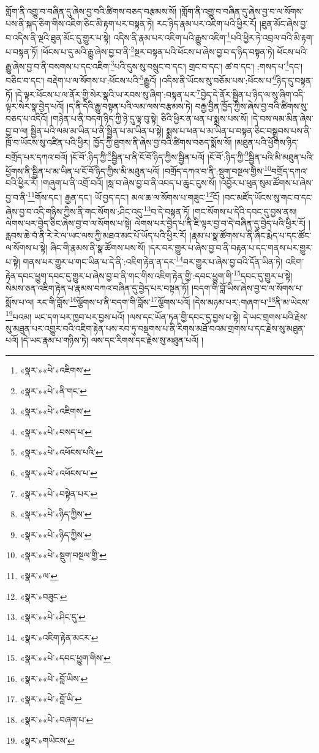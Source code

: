 གློག་ནི་འགྱུ་བ་བཞིན་དུ་ཞེས་བྱ་བའི་ཚིགས་བཅད་བརྩམས་སོ། །གློག་ནི་འགྱུ་བ་བཞིན་དུ་ཞེས་བྱ་བ་ལ་སོགས་པས་ནི་སྐད་ཅིག་གིས་འཇིག་ཅིང་མི་རྟག་པར་བསྟན་ཏེ། རང་ཉིད་རྣམ་པར་འཇིག་པའི་ཕྱིར་རོ། །ཐུན་མོང་ཞེས་བྱ་བ་འདིས་ནི་ལྔའི་ཐུན་མོང་དུ་གྱུར་པ་སྟེ། འདིས་ནི་རྣམ་པར་འཇིག་པའི་རྒྱུས་འཇིག་\footnote{«སྣར་»«པེ་»འཇིགས་}པའི་ཕྱིར་ཏེ་འབྲལ་བའི་མི་རྟག་པ་བསྟན་ཏོ། །ཕོངས་པ་དུ་མའི་རྒྱུ་ཞེས་བྱ་བ་ནི་\footnote{«སྣར་»«པེ་»ནི་གང་}སྔར་བསྟན་པའི་ཕོངས་པ་ཞེས་བྱ་བ་ད་ཉིད་བསྟན་ཏེ། ཕོངས་པའི་རྒྱུ་ཞེས་བྱ་བ་ནི་བསགས་པ་དང་འཇིག་\footnote{«སྣར་»«པེ་»འཇིགས་}པའི་དུས་སུ་བསྲུང་བ་དང་། གྲང་བ་དང་། ཚ་བ་དང་། :གསད་པ་\footnote{«སྣར་»«པེ་»བསད་པ་}དང་། བཅིང་བ་དང་། བརྡེག་པ་ལ་སོགས་པ་:ཕོངས་པའི་\footnote{«སྣར་»«པེ་»འཕོངས་པའི་}རྒྱུའོ། །འདིས་ནི་ཡོངས་སུ་བཅོམ་པས་:ཕོངས་པ་\footnote{«སྣར་»«པེ་»འཕོངས་པ་}ཉིད་དུ་བསྟན་ཏོ། །དེ་ལྟར་ཕོངས་པ་ལ་ནོར་གྱི་སེར་སྣའི་ཡ་རབས་སུ་ཞིག་:བསྟན་པར་\footnote{«སྣར་»«པེ་»བསྟེན་པར་}བྱེད་དེ་ནོར་སྦྱིན་པ་ཉིད་ལ་སུ་ཞིག་འདི་ལྟར་སེར་སྣ་བྱེད་པའོ། །ད་ནི་དེའི་རྒྱུ་བསྟན་པའི་ལམ་ལས་བརྩམས་ཏེ། བརྒྱ་བྱིན་ཁྱོད་ཀྱིས་ཞེས་བྱ་བའི་ཚིགས་སུ་བཅད་པ་འདིའོ། །གཉེན་པ་ནི་བདག་ཉིད་ཀྱི་ཉེ་དུ་ལྟ་བུ་སྟེ། ཅིའི་ཕྱིར་ན་ཕན་པ་སྨྲས་པས་སོ། །དེ་བས་ལམ་མིན་ཞེས་བྱ་བ་ལ། སྦྱིན་པའི་ལམ་མ་ཡིན་པ་ནི་སྦྱིན་པ་མ་ཡིན་པ་སྟེ། སྨྲས་པ་ཕན་པ་མ་ཡིན་པ་བསྟན་ཅིང་བསྒྲུབས་པས་ནི་ཁྲོ་བ་ཡོངས་སུ་འཛིན་པའི་ཕྱིར། ཁྱོད་ཀྱི་ཐུགས་ནི་ཞེས་བྱ་བའི་ཚིགས་བཅད་སྨོས་སོ། །མཐུན་པའི་ཕྱོགས་ཉིད་བགྲོད་པར་དཀའ་བའོ། །ངོ་བོ་:ཉིད་ཀྱི་\footnote{«སྣར་»«པེ་»ཉིད་ཀྱིས་}སྦྱིན་པ་ནི་ངོ་བོ་ཉིད་ཀྱིས་སྦྱིན་པའོ། །ངོ་བོ་:ཉིད་ཀྱི་\footnote{«སྣར་»«པེ་»ཉིད་ཀྱིས་}སྦྱིན་པའི་མི་མཐུན་པའི་ཕྱོགས་ནི་སྦྱིན་པ་མ་ཡིན་པ་ངོ་བོ་ཉིད་ཀྱིས་མི་མཐུན་པའོ། །བགྲོད་དཀའ་བ་ནི་:སྡུག་བསྔལ་གྱིས་\footnote{«སྣར་»«པེ་»སྡུག་བསྔལ་གྱི་}བགྲོད་དཀའ་བའི་ཕྱིར་རོ། །གཞུག་པ་ནི་འགྲོ་བའོ། །སླ་བ་ཞེས་བྱ་བ་ནི་འབད་པ་ཆུང་ངུས་སོ། །འབྱོར་པ་ཕུན་སུམ་ཚོགས་པ་ཞེས་བྱ་བ་ནི་\footnote{«སྣར་»ལ་}གོས་དང་། རྒྱན་དང་། ཡོ་བྱད་དང་། མལ་ཆ་ལ་སོགས་པ་གཟུང་\footnote{«སྣར་»བཟུང་}ངོ། །བང་མཛོད་ཡོངས་སུ་གང་བ་དང་ཞེས་བྱ་བ་འདི་གཉིས་ཀྱིས་ནི་གང་སོགས་:ཤིང་འདུ་\footnote{«སྣར་»«པེ་»ཤིང་དུ་}བ་དེ་བསྟན་ཏོ། །གང་སོགས་པ་དེའི་དབང་དུ་བྱས་ནས། ལེགས་པར་བྱེད་ཅིང་ཞེས་བྱ་བ་ལ་སོགས་པ་སྟེ། ལེགས་པར་བྱེད་པ་ནི་ཇི་ལྟར་བྱ་བ་དེ་བཞིན་དུ་བྱེད་པའི་ཕྱིར་རོ། །རླབས་ཆེ་བཾ་ནི་རེ་རེ་ལ་ཡང་ལས་ཀྱི་མཐའ་མང་པོ་ཡོད་པའི་ཕྱིར་རོ། །རྣམ་པ་སྣ་ཚོགས་པ་ནི་ཞིང་རྨེད་པ་དང་ཚོང་ལ་སོགས་པ་སྟེ། ཞིང་གི་རྣམས་ནི་སྣ་ཚོགས་པས་སོ། །དར་བར་གྱུར་པ་ཞེས་བྱ་བ་ནི་བརྟན་པ་དང་གནས་པར་གྱུར་པ་སྟེ། གནས་པར་གྱུར་པ་གང་ཡིན་པ་དེ་ནི་:འཇིག་རྟེན་ན་དར་\footnote{«སྣར་»འཇིག་རྟེན་མངར་}བར་གྱུར་པ་ཞེས་བྱ་བའི་དོན་ཡིན་ཏེ། འཇིག་རྟེན་དབང་ཕྱུག་དབང་དུ་གྱུར་པ་ཞེས་བྱ་བ་ནི་གང་གིས་འཇིག་རྟེན་གྱི་:དབང་ཕྱུག་གི་\footnote{«སྣར་»«པེ་»དབང་ཕྱུག་གིས་}དབང་དུ་གྱུར་པ་སྟེ། སེམས་ཅན་འཇིག་རྟེན་པ་རྣམས་བཀའ་བཞིན་དུ་བྱེད་པར་བསྟན་ཏོ། །བདག་གི་བློ་ཡིས་ཞེས་བྱ་བ་ལ་སོགས་པ་སྨོས་པ་ལ། རང་གི་བློས་\footnote{«སྣར་»«པེ་»བློ་ཡིས་}ལྕོགས་པ་ནི་བདག་གི་བློས་\footnote{«སྣར་»«པེ་»བློ་ཡི་}ལྕོགས་པའོ། །དེས་མཉམ་པར་:གཞག་པ་\footnote{«སྣར་»«པེ་»བཞག་པ་}ནི་མ་ཡེངས་\footnote{«སྣར་»གཡེངས་}པའམ། ཡང་དག་པར་ཁྱབ་པར་བྱས་པའོ། །ལས་དང་ཡོན་ཏན་གྱི་དབང་དུ་བྱས་པ་སྟེ། དེ་ཡང་གྲགས་པའི་རྗེས་སུ་མཐུན་པར་འགྱུར་བའི་འཇིག་རྟེན་པས་རབ་ཏུ་བསྔགས་པ་ནི་རིགས་མཐོ་བའམ་གྲགས་པ་དང་རྗེས་སུ་མཐུན་པའོ། །དེ་ཡང་རྣམ་པ་གཉིས་ཏེ། ལས་དང་རིགས་དང་རྗེས་སུ་མཐུན་པའོ། །
